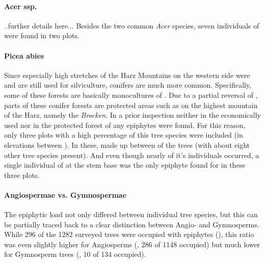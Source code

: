 \documentclass[12pt, a4paper, oneside, draft]{scrartcl}
\begin{document}
	
	
		\paragraph{Acer ssp.}
		..further details here... Besides the two common \textit{Acer} species, seven individuals of \acampestre were found in two plots.
		
		\paragraph{Picea abies}  Since especially high stretches of the Harz Mountains on the western side were and are still used for silviculture, conifers are much more common. Specifically, some of these forests are basically monocultures of \pabies. Due to a partial reversal of ,  parts of these conifer forests are protected areas such as on the highest mountain of the Harz, namely the \emph{Brocken}. In a prior inspection neither in the economically used nor in the protected forest of \pabies any epiphytes were found. For this reason, only three plots with a high percentage of this tree species were included (in elevations between ). In these, \pabies made up between  of the trees (with about eight other tree species present). And even though nearly  of it's individuals occurred, a single individual of \oacetosella at the stem base was the only epiphyte found for \pabies in these three plots. 
		
		\paragraph{Angiospermae vs. Gymnospermae}
		The epiphytic load not only differed between individual tree species, but this can be partially traced back to a clear distinction between Angio- and Gymnosperms. While 296 of the 1282 surveyed trees were occupied with epiphytes (), this ratio was even slightly higher for Angiosperms (, 286 of 1148 occupied) but much lower for Gymnosperm trees (, 10 of 134 occupied). 
		
	
\end{document}
